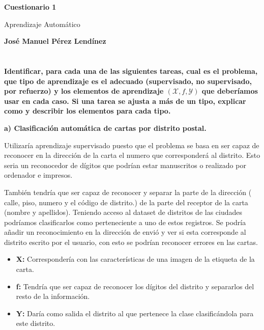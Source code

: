 \documentclass[titlepage]{article}
\begin{document}
	\begin{titlepage}
		\begin{center}
			\vspace*{1cm}
			\date{} %
			\Huge
			\textbf{Cuestionario 1}
			
			\vspace{0.5cm}
			\LARGE
			Aprendizaje Automático
			
			\vspace{1.5cm}
			
			\textbf{José Manuel Pérez Lendínez}
			

			
		\end{center}
	\end{titlepage}	
		\newpage
		\section{}
		
		\textbf{Identificar, para cada una de las siguientes tareas, cual es el problema, que tipo de
		aprendizaje es el adecuado (supervisado, no supervisado, por refuerzo) y los elementos de
		aprendizaje $(\mathcal{X}, f, \mathcal{Y})$ que deberíamos usar en cada caso. Si una tarea se ajusta a más de
		un tipo, explicar como y describir los elementos para cada tipo.}
		
		\textbf{a) Clasificación automática de cartas por distrito postal.}
		\newline
		
		Utilizaría aprendizaje supervisado puesto que el problema se basa en ser capaz de reconocer en la dirección de la carta el numero que corresponderá al distrito. Esto seria un reconocedor de dígitos que podrían estar manuscritos o realizado por ordenador e impresos. 
		
		También tendría que ser capaz de reconocer y separar la parte de la dirección ( calle, piso, numero y el código de distrito.) de la parte del receptor de la carta (nombre y apellidos). Teniendo acceso al dataset de distritos de las ciudades podríamos clasificarlos como perteneciente a uno de estos registros. Se podría añadir un reconocimiento en la dirección de envió y ver si esta corresponde al distrito escrito por el usuario, con esto se podrían reconocer errores en las cartas.
		
		\begin{itemize}
			\item \textbf{X:} Correspondería con las características de una imagen de la etiqueta de la carta.
			\item \textbf{f:} Tendría que ser capaz de reconocer los dígitos del distrito y separarlos del resto de la información.
			\item \textbf{Y: } Daría como salida el distrito al que pertenece la clase clasificándola para este distrito.
			
		\end{itemize}
\end{document}
